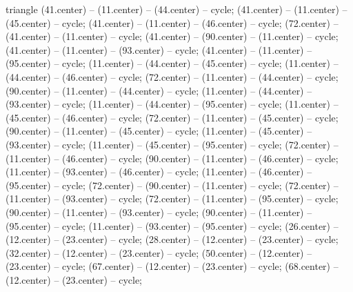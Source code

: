 {\begin{pgfonlayer}{triangle}
 (41.center) -- (11.center) -- (44.center) -- cycle; 
 (41.center) -- (11.center) -- (45.center) -- cycle; 
 (41.center) -- (11.center) -- (46.center) -- cycle; 
 (72.center) -- (41.center) -- (11.center) -- cycle; 
 (41.center) -- (90.center) -- (11.center) -- cycle; 
 (41.center) -- (11.center) -- (93.center) -- cycle; 
 (41.center) -- (11.center) -- (95.center) -- cycle; 
 (11.center) -- (44.center) -- (45.center) -- cycle; 
 (11.center) -- (44.center) -- (46.center) -- cycle; 
 (72.center) -- (11.center) -- (44.center) -- cycle; 
 (90.center) -- (11.center) -- (44.center) -- cycle; 
 (11.center) -- (44.center) -- (93.center) -- cycle; 
 (11.center) -- (44.center) -- (95.center) -- cycle; 
 (11.center) -- (45.center) -- (46.center) -- cycle; 
 (72.center) -- (11.center) -- (45.center) -- cycle; 
 (90.center) -- (11.center) -- (45.center) -- cycle; 
 (11.center) -- (45.center) -- (93.center) -- cycle; 
 (11.center) -- (45.center) -- (95.center) -- cycle; 
 (72.center) -- (11.center) -- (46.center) -- cycle; 
 (90.center) -- (11.center) -- (46.center) -- cycle; 
 (11.center) -- (93.center) -- (46.center) -- cycle; 
 (11.center) -- (46.center) -- (95.center) -- cycle; 
 (72.center) -- (90.center) -- (11.center) -- cycle; 
 (72.center) -- (11.center) -- (93.center) -- cycle; 
 (72.center) -- (11.center) -- (95.center) -- cycle; 
 (90.center) -- (11.center) -- (93.center) -- cycle; 
 (90.center) -- (11.center) -- (95.center) -- cycle; 
 (11.center) -- (93.center) -- (95.center) -- cycle; 
 (26.center) -- (12.center) -- (23.center) -- cycle; 
 (28.center) -- (12.center) -- (23.center) -- cycle; 
 (32.center) -- (12.center) -- (23.center) -- cycle; 
 (50.center) -- (12.center) -- (23.center) -- cycle; 
 (67.center) -- (12.center) -- (23.center) -- cycle; 
 (68.center) -- (12.center) -- (23.center) -- cycle; 

\end{pgfonlayer}}
